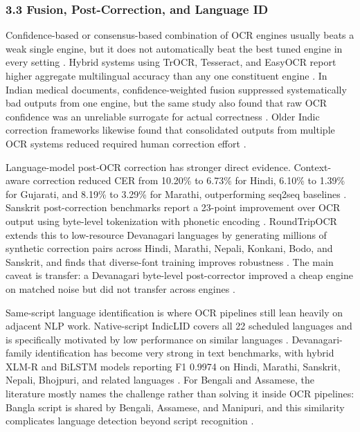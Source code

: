     
    \subsubsection*{3.3 Fusion, Post-Correction, and Language ID}
    
    
    Confidence-based or consensus-based combination of OCR engines usually beats a weak single engine, but it does not automatically beat the best tuned engine in every setting  \cite{Zilani2026A} \cite{Jhala2026PragyaDoc:} \cite{Saluja2017A}. Hybrid systems using TrOCR, Tesseract, and EasyOCR report higher aggregate multilingual accuracy than any one constituent engine  \cite{Zilani2026A}. In Indian medical documents, confidence-weighted fusion suppressed systematically bad outputs from one engine, but the same study also found that raw OCR confidence was an unreliable surrogate for actual correctness  \cite{Jhala2026PragyaDoc:}. Older Indic correction frameworks likewise found that consolidated outputs from multiple OCR systems reduced required human correction effort  \cite{Saluja2017A}.
    
    
    Language-model post-OCR correction has stronger direct evidence. Context-aware correction reduced CER from 10.20\% to 6.73\% for Hindi, 6.10\% to 1.39\% for Gujarati, and 8.19\% to 3.29\% for Marathi, outperforming seq2seq baselines  \cite{Bhandari2026A}. Sanskrit post-correction benchmarks report a 23-point improvement over OCR output using byte-level tokenization with phonetic encoding  \cite{Maheshwari2022A}. RoundTripOCR extends this to low-resource Devanagari languages by generating millions of synthetic correction pairs across Hindi, Marathi, Nepali, Konkani, Bodo, and Sanskrit, and finds that diverse-font training improves robustness  \cite{Kashid2024RoundTripOCR:}. The main caveat is transfer: a Devanagari byte-level post-corrector improved a cheap engine on matched noise but did not transfer across engines  \cite{Singh2026Can}.
    
    
    Same-script language identification is where OCR pipelines still lean heavily on adjacent NLP work. Native-script IndicLID covers all 22 scheduled languages and is specifically motivated by low performance on similar languages  \cite{Madhani2023Bhasa-Abhijnaanam:}. Devanagari-family identification has become very strong in text benchmarks, with hybrid XLM-R and BiLSTM models reporting F1 0.9974 on Hindi, Marathi, Sanskrit, Nepali, Bhojpuri, and related languages  \cite{Manukonda2025byteSizedLLM@NLU}. For Bengali and Assamese, the literature mostly names the challenge rather than solving it inside OCR pipelines: Bangla script is shared by Bengali, Assamese, and Manipuri, and this similarity complicates language detection beyond script recognition  \cite{Sarungbam2014Script} \cite{Sharma2019Categorization}.
    
